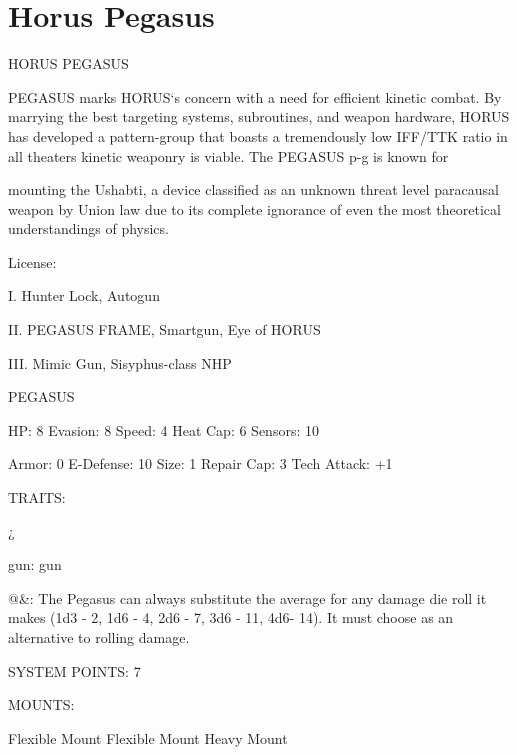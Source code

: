 \section{Horus Pegasus}

                                         HORUS PEGASUS  

PEGASUS marks HORUS‘s concern with a need for efficient kinetic combat. By marrying the best targeting  
systems, subroutines, and weapon hardware, HORUS has developed a pattern-group that boasts a  
tremendously low IFF/TTK ratio in all theaters kinetic weaponry is viable. The PEGASUS p-g is known for  

mounting the Ushabti, a device classified as an unknown threat level paracausal weapon by Union law due  
to its complete ignorance of even the most theoretical understandings of physics.  

                                                  License:
 
I. Hunter Lock, Autogun
 
II. PEGASUS FRAME, Smartgun, Eye of HORUS
 
III. Mimic Gun, Sisyphus-class NHP
 

                                                                                                           


                                                    PEGASUS 

  HP: 8           Evasion: 8                              Speed: 4            Heat Cap: 6         Sensors: 10 

  Armor: 0        E-Defense: 10                           Size: 1             Repair Cap: 3       Tech Attack:  
                                                                                                  +1 

                                                      TRAITS: 

  ¿%
 
  gun: gun
 
  @\&: The Pegasus can always substitute the average for any damage die roll it makes  (1d3 - 2, 1d6 - 4,  
  2d6 - 7, 3d6 - 11, 4d6- 14). It must choose as an alternative to rolling damage. 

                                                SYSTEM POINTS: 7 

                                                     MOUNTS: 

  Flexible Mount                      Flexible Mount                          Heavy Mount 

